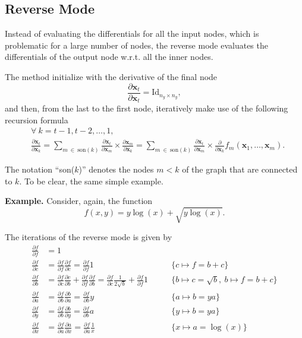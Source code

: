 \subsection{Reverse Mode}

Instead of evaluating the differentials for all the input nodes, which
is problematic for a large number of nodes, the reverse mode evaluates
the differentials of the output node w.r.t. all the inner nodes.

The method initialize with the derivative of the final node
\[
  \frac{\partial \mathbf{x}_{t}}{\partial \mathbf{x}_{t}} =
  \text{Id}_{n_{y} \times n_{y}},
\]
and then, from the last to the first node, iteratively make use of the
following recursion formula
\begin{align*}
  &\forall~k = t - 1, t - 2, \dots, 1,\\
  &\frac{\partial\mathbf{x}_{t}}{\partial\mathbf{x}_{k}} =
    \sum_{m~\in~\text{son}(k)}
    \frac{\partial\mathbf{x}_{t}}{\partial\mathbf{x}_{m}} \times
    \frac{\partial\mathbf{x}_{m}}{\partial\mathbf{x}_{k}} =
    \sum_{m~\in~\text{son}(k)}
    \frac{\partial\mathbf{x}_{t}}{\partial\mathbf{x}_{m}} \times
    \frac{\partial}{\partial\mathbf{x}_{k}}
    f_{m}(\mathbf{x}_{1}, \dots, \mathbf{x}_{m}).
\end{align*}

The notation ``son(\(k\))'' denotes the nodes \(m < k\) of the graph
that are connected to \(k\). To be clear, the same simple example.

\noindent\textbf{Example.}\hspace{.5cm}
Consider, again, the function
\[
  f(x, y) = y\log(x) + \sqrt{y\log(x)}.
\]

The iterations of the reverse mode is given by
\begin{align*}
  \frac{\partial f}{\partial f} &= 1\\
  \frac{\partial f}{\partial c} &=
  \frac{\partial f}{\partial f} \frac{\partial f}{\partial c} =
  \frac{\partial f}{\partial f} 1\qquad &\{c \mapsto f = b + c\}\\
  \frac{\partial f}{\partial b} &=
  \frac{\partial f}{\partial c} \frac{\partial c}{\partial b} +
  \frac{\partial f}{\partial f} \frac{\partial f}{\partial b} =
  \frac{\partial f}{\partial c} \frac{1}{2\sqrt{b}} +
  \frac{\partial f}{\partial f} 1\qquad
  &\{b \mapsto c = \sqrt{b},~b \mapsto f = b + c\}\\
  \frac{\partial f}{\partial a} &=
  \frac{\partial f}{\partial b} \frac{\partial b}{\partial a} =
  \frac{\partial f}{\partial b} y\qquad &\{a \mapsto b = ya\}\\
  \frac{\partial f}{\partial y} &=
  \frac{\partial f}{\partial b} \frac{\partial b}{\partial y} =
  \frac{\partial f}{\partial b} a \qquad &\{y \mapsto b = ya\}\\
  \frac{\partial f}{\partial x} &=
  \frac{\partial f}{\partial a} \frac{\partial a}{\partial x} =
  \frac{\partial f}{\partial a} \frac{1}{x} \qquad
  &\{x \mapsto a = \log(x)\}
\end{align*}


